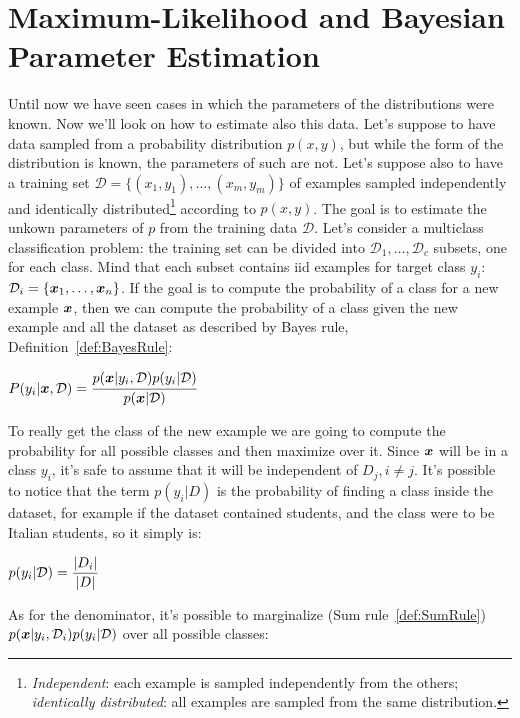 \chapter{Maximum-Likelihood and Bayesian Parameter Estimation}
Until now we have seen cases in which the parameters of the distributions were known. Now we'll look on how to estimate also this data. \newline
Let's suppose to have data sampled from a probability distribution $p(x,y)$, but while the form of the distribution is known, the parameters of such are not.  Let's suppose also to have a training set $\mathcal{D}=\{(x_1, y_1),\hdots,(x_m,y_m)\}$ of examples sampled independently and identically distributed\footnote{\textit{Independent}: each example is sampled independently from the others; \textit{identically distributed}: all examples are sampled from the same distribution.} according to $p(x,y)$. The goal is to estimate the unkown parameters of $p$ from the training data $\mathcal{D}$. \newline
Let's consider a multiclass classification problem: the training set can be divided into $\mathcal{D}_1,\hdots, \mathcal{D}_c$ subsets, one for each class. Mind that each subset contains iid examples for target class $y_i$: $\mathcal{D}_i=\{\bm{x}_1,\hdots,\bm{x}_n\}$. \newline
If the goal is to compute the probability of a class for a new example $\bm{x}$, then we can compute the probability of a class given the new example and all the dataset as described by Bayes rule, Definition~\ref{def:BayesRule}:
\begin{center}
	$\displaystyle P(y_i\vert\bm{x},\mathcal{D})=\cfrac{p(\bm{x}\vert y_i,\mathcal{D})p(y_i\vert\mathcal{D})}{p(\bm{x}\vert\mathcal{D})}$
\end{center}
To really get the class of the new example we are going to compute the probability for all possible classes and then maximize over it. \newline
Since $\bm{x}$ will be in a class $y_i$, it's safe to assume that it will be independent of $D_j, i\neq j$. It's possible to notice that the term $p(y_i\vert D)$ is the probability of finding a class inside the dataset, for example if the dataset contained students, and the class were to be Italian students, so it simply is:
\begin{center}
	$\displaystyle p(y_i\vert \mathcal{D})=\frac{\vert D_i \vert}{\vert D \vert}$
\end{center}
As for the denominator, it's possible to marginalize (Sum rule~\ref{def:SumRule}) $p(\bm{x}\vert y_i,\mathcal{D}_i)p(y_i\vert \mathcal{D})$ over all possible classes:
